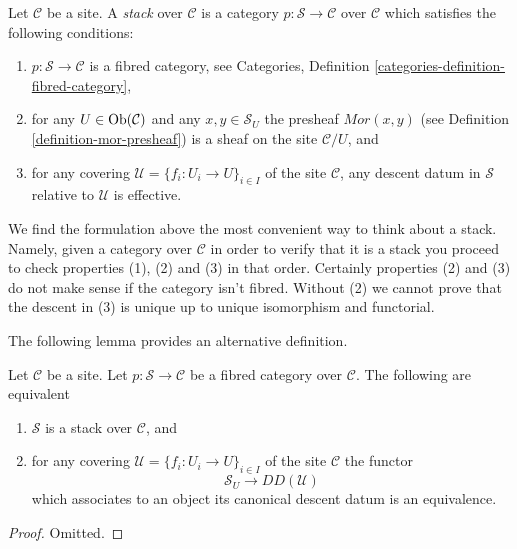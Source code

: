 \begin{definition}
\label{definition-stack}
Let $\mathcal{C}$ be a site. A {\it stack} over $\mathcal{C}$
is a category $p : \mathcal{S} \to \mathcal{C}$ over $\mathcal{C}$ which
satisfies the following conditions:
\begin{enumerate}
\item $p : \mathcal{S} \to \mathcal{C}$ is a fibred category, see
Categories, Definition \ref{categories-definition-fibred-category},
\item for any $U \in \mathop{\mathrm{Ob}}\nolimits(\mathcal{C})$ and any $x, y \in \mathcal{S}_U$
the presheaf $\mathit{Mor}(x, y)$ (see
Definition \ref{definition-mor-presheaf}) is a sheaf on
the site $\mathcal{C}/U$, and
\item for any covering $\mathcal{U} = \{f_i : U_i \to U\}_{i \in I}$
of the site $\mathcal{C}$, any descent datum in $\mathcal{S}$
relative to $\mathcal{U}$ is effective.
\end{enumerate}
\end{definition}

\noindent
We find the formulation above the most convenient way to think about
a stack. Namely, given a category over $\mathcal{C}$ in order to verify
that it is a stack you proceed to check properties (1), (2) and
(3) in that order. Certainly properties (2) and (3) do not make sense
if the category isn't fibred. Without (2) we cannot prove that the
descent in (3) is unique up to unique isomorphism and functorial.

\medskip\noindent
The following lemma provides an alternative definition.

\begin{lemma}
\label{lemma-stack-equivalences}
Let $\mathcal{C}$ be a site.
Let $p : \mathcal{S} \to \mathcal{C}$ be a fibred category
over $\mathcal{C}$. The following are equivalent
\begin{enumerate}
\item $\mathcal{S}$ is a stack over $\mathcal{C}$, and
\item for any covering $\mathcal{U} = \{f_i : U_i \to U\}_{i \in I}$
of the site $\mathcal{C}$ the functor
$$
\mathcal{S}_U \longrightarrow DD(\mathcal{U})
$$
which associates to an
object its canonical descent datum is an equivalence.
\end{enumerate}
\end{lemma}

\begin{proof}
Omitted.
\end{proof}

